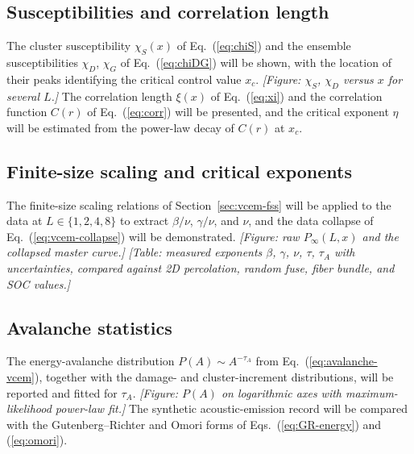 \documentclass[preprint,12pt]{elsarticle}
\begin{document}
\subsection{Susceptibilities and correlation length}
\label{sec:res-chi}

The cluster susceptibility $\chi_S(x)$ of Eq.~(\ref{eq:chiS}) and the ensemble
susceptibilities $\chi_D$, $\chi_G$ of Eq.~(\ref{eq:chiDG}) will be shown, with the
location of their peaks identifying the critical control value $x_c$. \emph{[Figure:
$\chi_S$, $\chi_D$ versus $x$ for several $L$.]} The correlation length $\xi(x)$ of
Eq.~(\ref{eq:xi}) and the correlation function $C(r)$ of Eq.~(\ref{eq:corr}) will be
presented, and the critical exponent $\eta$ will be estimated from the power-law decay
of $C(r)$ at $x_c$.

\subsection{Finite-size scaling and critical exponents}
\label{sec:res-fss}

The finite-size scaling relations of Section~\ref{sec:vcem-fss} will be applied to the
data at $L\in\{1,2,4,8\}$ to extract $\beta/\nu$, $\gamma/\nu$, and $\nu$, and the data
collapse of Eq.~(\ref{eq:vcem-collapse}) will be demonstrated. \emph{[Figure: raw
$P_\infty(L,x)$ and the collapsed master curve.]} \emph{[Table: measured exponents
$\beta$, $\gamma$, $\nu$, $\tau$, $\tau_A$ with uncertainties, compared against
2D percolation, random fuse, fiber bundle, and SOC values.]}

\subsection{Avalanche statistics}
\label{sec:res-avalanche}

The energy-avalanche distribution $P(A)\sim A^{-\tau_A}$ from
Eq.~(\ref{eq:avalanche-vcem}), together with the damage- and cluster-increment
distributions, will be reported and fitted for $\tau_A$. \emph{[Figure: $P(A)$ on
logarithmic axes with maximum-likelihood power-law fit.]} The synthetic
acoustic-emission record will be compared with the Gutenberg--Richter and Omori forms
of Eqs.~(\ref{eq:GR-energy}) and (\ref{eq:omori}).
\end{document}
